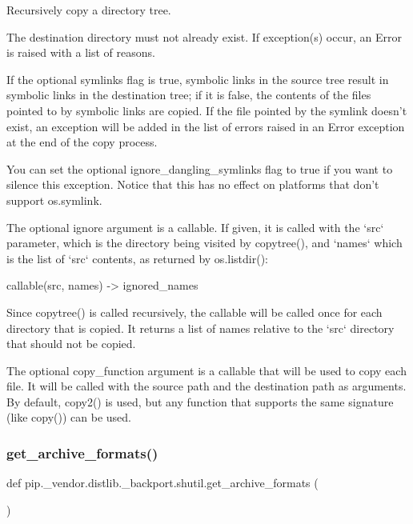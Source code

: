 \begin{DoxyVerb}Recursively copy a directory tree.

The destination directory must not already exist.
If exception(s) occur, an Error is raised with a list of reasons.

If the optional symlinks flag is true, symbolic links in the
source tree result in symbolic links in the destination tree; if
it is false, the contents of the files pointed to by symbolic
links are copied. If the file pointed by the symlink doesn't
exist, an exception will be added in the list of errors raised in
an Error exception at the end of the copy process.

You can set the optional ignore_dangling_symlinks flag to true if you
want to silence this exception. Notice that this has no effect on
platforms that don't support os.symlink.

The optional ignore argument is a callable. If given, it
is called with the `src` parameter, which is the directory
being visited by copytree(), and `names` which is the list of
`src` contents, as returned by os.listdir():

    callable(src, names) -> ignored_names

Since copytree() is called recursively, the callable will be
called once for each directory that is copied. It returns a
list of names relative to the `src` directory that should
not be copied.

The optional copy_function argument is a callable that will be used
to copy each file. It will be called with the source path and the
destination path as arguments. By default, copy2() is used, but any
function that supports the same signature (like copy()) can be used.\end{DoxyVerb}
 \mbox{\label{namespacepip_1_1__vendor_1_1distlib_1_1__backport_1_1shutil_a0f02e72a471872ab222973d2903fdf13}} 
\subsubsection{\texorpdfstring{get\+\_\+archive\+\_\+formats()}{get\_archive\_formats()}}
{\footnotesize\ttfamily def pip.\+\_\+vendor.\+distlib.\+\_\+backport.\+shutil.\+get\+\_\+archive\+\_\+formats (\begin{DoxyParamCaption}{ }\end{DoxyParamCaption})}

